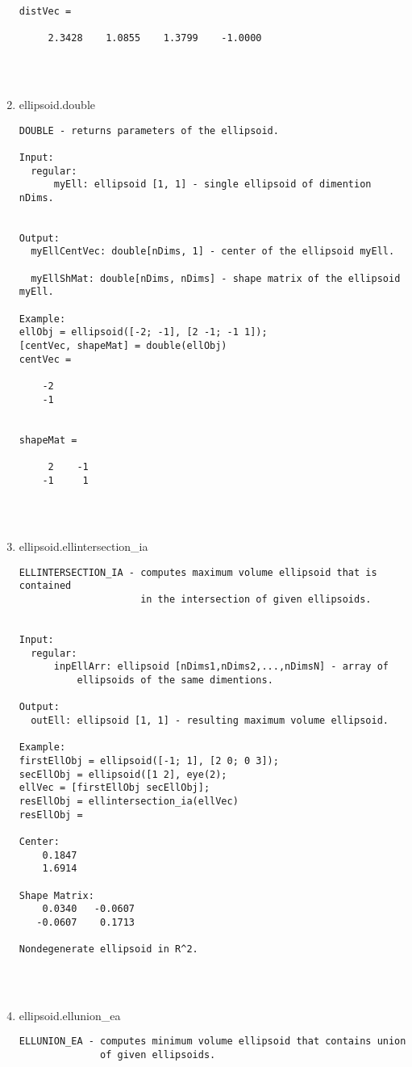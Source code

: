 \begin{enumerate}
\begin{lstlisting}
distVec =

     2.3428    1.0855    1.3799    -1.0000




\end{lstlisting}
\fontfamily{\familydefault}
\selectfont
\item {ellipsoid.double}
\selectfont
\begin{lstlisting}
DOUBLE - returns parameters of the ellipsoid.

Input:
  regular:
      myEll: ellipsoid [1, 1] - single ellipsoid of dimention nDims.


Output:
  myEllCentVec: double[nDims, 1] - center of the ellipsoid myEll.

  myEllShMat: double[nDims, nDims] - shape matrix of the ellipsoid myEll.

Example:
ellObj = ellipsoid([-2; -1], [2 -1; -1 1]);
[centVec, shapeMat] = double(ellObj)
centVec =

    -2
    -1


shapeMat =

     2    -1
    -1     1




\end{lstlisting}
\fontfamily{\familydefault}
\selectfont
\item {ellipsoid.ellintersection\_ia}
\selectfont
\begin{lstlisting}
ELLINTERSECTION_IA - computes maximum volume ellipsoid that is contained
                     in the intersection of given ellipsoids.


Input:
  regular:
      inpEllArr: ellipsoid [nDims1,nDims2,...,nDimsN] - array of
          ellipsoids of the same dimentions.

Output:
  outEll: ellipsoid [1, 1] - resulting maximum volume ellipsoid.

Example:
firstEllObj = ellipsoid([-1; 1], [2 0; 0 3]);
secEllObj = ellipsoid([1 2], eye(2);
ellVec = [firstEllObj secEllObj];
resEllObj = ellintersection_ia(ellVec)
resEllObj =

Center:
    0.1847
    1.6914

Shape Matrix:
    0.0340   -0.0607
   -0.0607    0.1713

Nondegenerate ellipsoid in R^2.




\end{lstlisting}
\fontfamily{\familydefault}
\selectfont
\item {ellipsoid.ellunion\_ea}
\selectfont
\begin{lstlisting}
ELLUNION_EA - computes minimum volume ellipsoid that contains union
              of given ellipsoids.


\end{lstlisting}
\end{enumerate}
